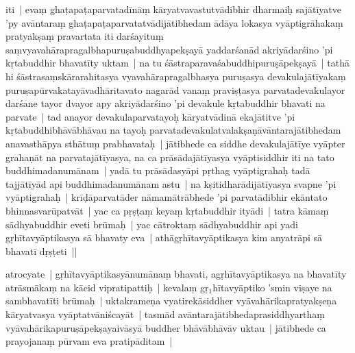 \documentclass[article,12pt,a4paper]{memoir}%
\newcounter{parCount}
\begin{document}
	  
	  

	  
	  \pstart \leavevmode%
	iti | evaṃ ghaṭapaṭaparvatadīnāṃ kāryatvavastutvādibhir dharmaiḥ sajātīyatve 'py avāntaraṃ ghaṭapaṭaparvatatvādijātibhedam ādāya lokasya vyāptigrāhakaṃ pratyakṣaṃ pravartata iti darśayituṃ saṃvyavahārapragalbhapuruṣabuddhyapekṣayā yaddarśanād akriyādarśino 'pi kṛtabuddhir bhavatīty uktam | na tu śāstraparavaśabuddhipuruṣāpekṣayā | tathā hi śāstrasaṃskārarahitasya vyavahārapragalbhasya puruṣasya devakulajātīyakaṃ puruṣapūrvakatayāvadhāritavato nagarād vanaṃ praviṣṭasya parvatadevakulayor darśane tayor dvayor apy akriyādarśino 'pi devakule kṛtabuddhir bhavati na parvate | tad anayor devakulaparvatayoḥ kāryatvādinā ekajātitve 'pi kṛtabuddhibhāvābhāvau na tayoḥ parvatadevakulatvalakṣaṇāvāntarajātibhedam anavasthāpya sthātuṃ prabhavataḥ | jātibhede ca siddhe devakulajātīye vyāpter grahaṇāt na parvatajātīyasya, na ca prāsādajātīyasya vyāptisiddhir iti na tato buddhimadanumānam | yadā tu prāsādasyāpi pṛthag vyāptigrahaḥ tadā tajjātīyād api buddhimadanumānam astu | na kṣitidharādijātīyasya svapne 'pi vyāptigrahaḥ | krīḍāparvatāder nāmamātrā\leavevmode{}\label{RNAms_30b}bhede 'pi parvatādibhir ekāntato bhinnasvarūpatvāt | \label{sarit__ratnakīrtinibandhāvali__146084}yac ca pṛṣṭaṃ keyaṃ kṛtabuddhir ityādi | tatra kāmaṃ sādhyabuddhir eveti brūmaḥ | yac cātroktaṃ sādhyabuddhir api yadi gṛhītavyāptikasya sā bhavaty eva | athāgṛhītavyāptikasya kim anyatrāpi sā bhavatī dṛṣṭeti ||
	{}
	\pend%
      

	  
	  \pstart \leavevmode%
	\label{thakur75-53.23}atrocyate | gṛhītavyāptikasyānumānaṃ bhavati, agṛhītavyāptikasya na bhavatīty atrāsmākaṃ na kācid vipratipattiḥ | kevalaṃ gṛ{\tiny $_{1}$}hītavyāptiko 'smin viṣaye na sambhavatīti brūmaḥ |\label{sarit__ratnakīrtinibandhāvali__146582} uktakrameṇa vyatirekāsiddher vyāvahārikapratyakṣeṇa kāryatvasya vyāptatvāniścayāt | tasmād avāntarajātibhedaprasiddhyarthaṃ vyāvahārikapuruṣāpekṣayaivāsyā buddher bhāvābhāvāv uktau | jātibhede ca prayojanaṃ pūrvam eva pratipāditam |
	{}
	\pend%
      
\end{document}

